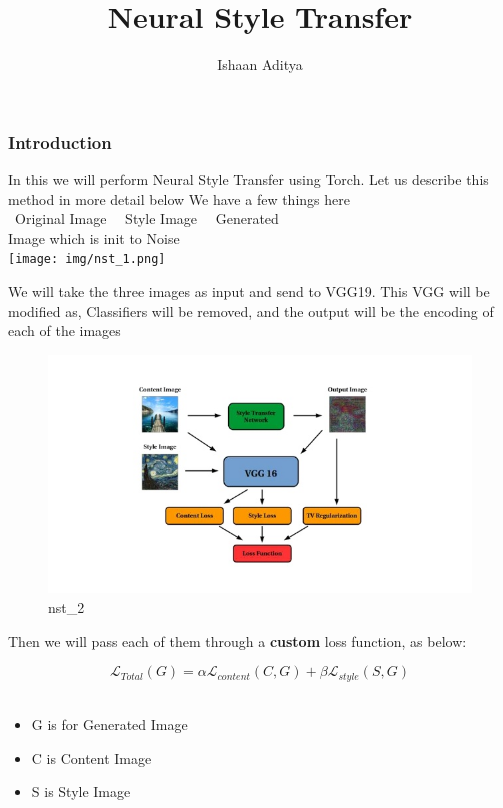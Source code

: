 \documentclass[11pt]{article}
\title{Neural Style Transfer}
\providecommand{\tightlist}{%
      \setlength{\itemsep}{0pt}\setlength{\parskip}{0pt}}
\begin{document}
\author {Ishaan Aditya}
    \maketitle
    \hypertarget{introduction}{
\subsubsection{Introduction}\label{introduction}}

In this we will perform Neural Style Transfer using Torch.
Let us describe this method in more detail below
We have a few things here \\
\textbullet \ Original Image \
\textbullet \ Style Image \
\textbullet \ Generated \\
Image which is init to Noise\\
 \texttt{[image: img/nst\_1.png]}

We will take the three images as input and send to VGG19.
This VGG will be modified as, Classifiers will be removed, and the
output will be the encoding of each of the images\\

\begin{figure}
    \centering
    \includegraphics{img/nst_2.jpg}
    \caption{nst\_2}
\end{figure}

\pagebreak
Then we will pass each of them through a \textbf{custom} loss function,
as below:

\[ 
\mathcal{L}_{Total} (G) = \alpha \mathcal{L}_{content}(C,G) + \beta \mathcal{L}_{style} (S,G)
\]
\\
\begin{itemize}
\tightlist
\item G is for Generated Image
\item C is Content Image
\item S is Style Image
\end{itemize}
\end{document}
